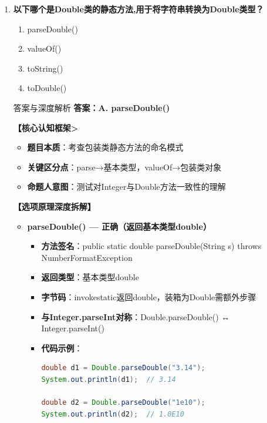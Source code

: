 \documentclass[12pt, a4paper]{ctexart}
\begin{document}
\begin{enumerate}[label=\textbf{\arabic*.}]
	      \vspace{1em}

	\item \textbf{以下哪个是Double类的静态方法,用于将字符串转换为Double类型？}
	      \begin{enumerate}[label=\Alph*.]
		      \item parseDouble()
		      \item valueOf()
		      \item toString()
		      \item toDouble()
	      \end{enumerate}

	      \begin{bluebox}{答案与深度解析}
		      \textbf{答案：A. parseDouble()}

		      \textbf{【核心认知框架>}
		      \begin{itemize}[label={}, leftmargin=*, nosep]
			      \item \textbf{题目本质}：考查包装类静态方法的命名模式
			      \item \textbf{关键区分点}：parse→基本类型，valueOf→包装类对象
			      \item \textbf{命题人意图}：测试对Integer与Double方法一致性的理解
		      \end{itemize}

		      \textbf{【选项原理深度拆解】}

		      \begin{itemize}[leftmargin=*, nosep, label={}]
			      \item[A] \textbf{parseDouble() — 正确（返回基本类型double）}
			            \begin{itemize}[label={}, leftmargin=*, nosep]
				            \item \textbf{方法签名}：public static double parseDouble(String s) throws NumberFormatException
				            \item \textbf{返回类型}：基本类型double
				            \item \textbf{字节码}：invokestatic返回double，装箱为Double需额外步骤
				            \item \textbf{与Integer.parseInt对称}：Double.parseDouble() ↔ Integer.parseInt()
				            \item \textbf{代码示例}：
				                  \begin{lstlisting}[language=Java]
double d1 = Double.parseDouble("3.14");
System.out.println(d1);  // 3.14

double d2 = Double.parseDouble("1e10");
System.out.println(d2);  // 1.0E10


\end{lstlisting}
\end{itemize}
\end{itemize}
\end{bluebox}
\end{enumerate}
\end{document}
